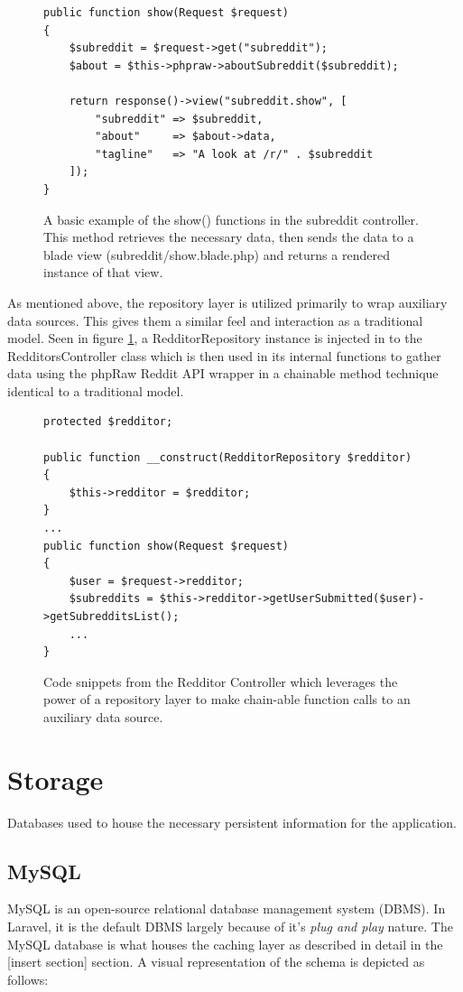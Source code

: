 \documentclass[msc,oneside]{ubcthesis}%
\begin{document}
\begin{figure}[H]
\begin{lstlisting}
public function show(Request $request)
{
	$subreddit = $request->get("subreddit");
	$about = $this->phpraw->aboutSubreddit($subreddit);
	
	return response()->view("subreddit.show", [
		"subreddit" => $subreddit,
		"about"     => $about->data,
		"tagline"   => "A look at /r/" . $subreddit
	]);
}
\end{lstlisting}
\caption[Example of Controller]{
A basic example of the show() functions in the subreddit controller. This method retrieves the necessary data, then sends the data to a blade view (subreddit/show.blade.php) and returns a rendered instance of that view.}
\end{figure}

As mentioned above, the repository layer is utilized primarily to wrap auxiliary data sources. This gives them a similar feel and interaction as a traditional model. Seen in figure \ref{fig:repository}, a RedditorRepository instance is injected in to the RedditorsController class which is then used in its internal functions to gather data using the phpRaw Reddit API wrapper in a chainable method technique identical to a traditional model.
\begin{figure}[!htb]
\begin{lstlisting}
protected $redditor;

public function __construct(RedditorRepository $redditor)
{
	$this->redditor = $redditor;
}
...
public function show(Request $request)
{
	$user = $request->redditor;
	$subreddits = $this->redditor->getUserSubmitted($user)->getSubredditsList();
	...
}
\end{lstlisting}
\caption[Example of Repository]{
Code snippets from the Redditor Controller which leverages the power of a repository layer to make chain-able function calls to an auxiliary data source.}
\label{fig:repository}
\end{figure}

\section{Storage}
Databases used to house the necessary persistent information for the application.

\subsection{MySQL}
MySQL is an open-source relational database management system (DBMS). In Laravel, it is the default DBMS largely because of it's \textit{plug and play} nature. The MySQL database is what houses the caching layer as described in detail in the [insert section] section. A visual representation of the schema is depicted as follows:
\end{document}
